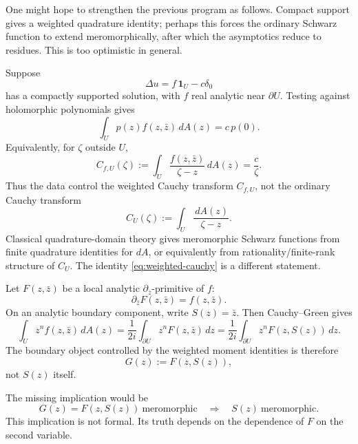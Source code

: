 \documentclass[11pt]{article}
\newcommand{\dd}{\,d}
\newcommand{\pbar}{\partial_{\bar z}}
\newcommand{\1}{\mathbf 1}
\begin{document}
One might hope to strengthen the previous program as follows. Compact support gives a
weighted quadrature identity; perhaps this forces the ordinary Schwarz function to extend
meromorphically, after which the asymptotics reduce to residues. This is too optimistic in
general.

Suppose
\[
  \Delta u=f\,\1_U-c\delta_0
\]
has a compactly supported solution, with \(f\) real analytic near \(\partial U\). Testing
against holomorphic polynomials gives
\begin{equation}\label{eq:weighted-quadrature}
  \int_U p(z)f(z,\bar z)\dd A(z)=c\,p(0).
\end{equation}
Equivalently, for \(\zeta\) outside \(U\),
\begin{equation}\label{eq:weighted-cauchy}
  C_{f,U}(\zeta):=\int_U\frac{f(z,\bar z)}{\zeta-z}\dd A(z)
  =
  \frac{c}{\zeta}.
\end{equation}
Thus the data control the weighted Cauchy transform \(C_{f,U}\), not the ordinary Cauchy
transform
\[
  C_U(\zeta):=\int_U\frac{\dd A(z)}{\zeta-z}.
\]
Classical quadrature-domain theory gives meromorphic Schwarz functions from finite
quadrature identities for \(dA\), or equivalently from rationality/finite-rank structure of
\(C_U\). The identity \eqref{eq:weighted-cauchy} is a different statement.

Let \(F(z,\bar z)\) be a local analytic \(\pbar\)-primitive of \(f\):
\[
  \pbar F(z,\bar z)=f(z,\bar z).
\]
On an analytic boundary component, write \(S(z)=\bar z\). Then Cauchy--Green gives
\[
  \int_U z^n f(z,\bar z)\dd A(z)
  =
  \frac{1}{2i}\int_{\partial U}z^nF(z,\bar z)\dd z
  =
  \frac{1}{2i}\int_{\partial U}z^nF(z,S(z))\dd z.
\]
The boundary object controlled by the weighted moment identities is therefore
\begin{equation}\label{eq:G-weighted-schwarz}
  G(z):=F(z,S(z)),
\end{equation}
not \(S(z)\) itself.

The missing implication would be
\begin{equation}\label{eq:bad-step2}
  G(z)=F(z,S(z))\ \text{meromorphic}
  \quad\Longrightarrow\quad
  S(z)\ \text{meromorphic}.
\end{equation}
This implication is not formal. Its truth depends on the dependence of \(F\) on the second
variable.
\end{document}

